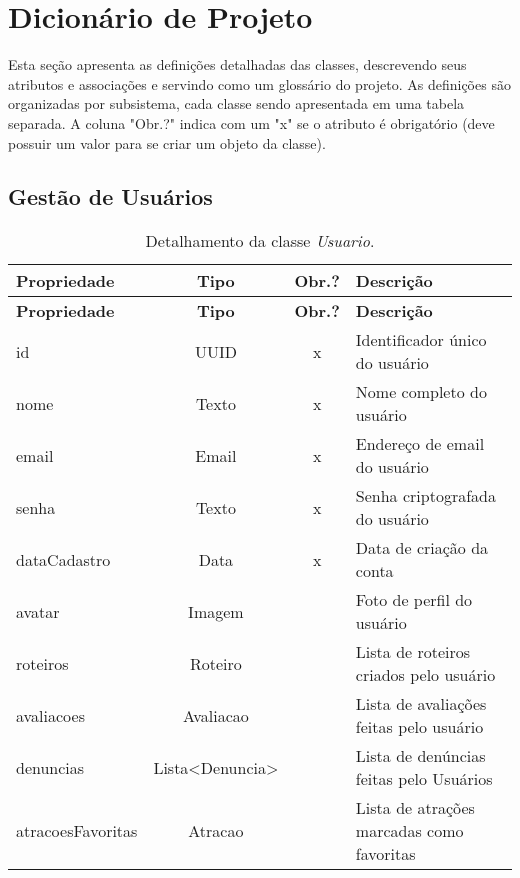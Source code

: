 \chapter{Dicionário de Projeto}
\label{sec-dicionario}
\vspace{-1cm}

Esta seção apresenta as definições detalhadas das classes, descrevendo seus atributos e associações e servindo como um glossário do projeto. As definições são organizadas por subsistema, cada classe sendo apresentada em uma tabela separada. A coluna "Obr.?" indica com um "x" se o atributo é obrigatório (deve possuir um valor para se criar um objeto da classe).

\section{Gestão de Usuários}
\label{sec-dicionario-usuarios}

\begin{longtable}{|p{3.5cm}|c|c|p{8cm}|}
    \caption{Detalhamento da classe \emph{Usuario}.}
    \label{tbl-dicionario-usuario} \\\hline 
    
    \rowcolor{lightgray}
    \textbf{Propriedade} & \textbf{Tipo} & \textbf{Obr.?} & \textbf{Descrição} \\\hline
    \endfirsthead
    \hline
    \rowcolor{lightgray}
    \textbf{Propriedade} & \textbf{Tipo} & \textbf{Obr.?} & \textbf{Descrição} \\\hline
    \endhead
    
    id & UUID & x & Identificador único do usuário \\\hline
    nome & Texto & x & Nome completo do usuário \\\hline
    email & Email & x & Endereço de email do usuário \\\hline
    senha & Texto & x & Senha criptografada do usuário \\\hline
    dataCadastro & Data & x & Data de criação da conta \\\hline
    avatar & Imagem & & Foto de perfil do usuário \\\hline
    roteiros & Roteiro & & Lista de roteiros criados pelo usuário \\\hline
    avaliacoes & Avaliacao & & Lista de avaliações feitas pelo usuário \\\hline
	denuncias & Lista<Denuncia> & & Lista de denúncias feitas pelo Usuários \\\hline
    atracoesFavoritas & Atracao & & Lista de atrações marcadas como favoritas \\\hline
\end{longtable}

